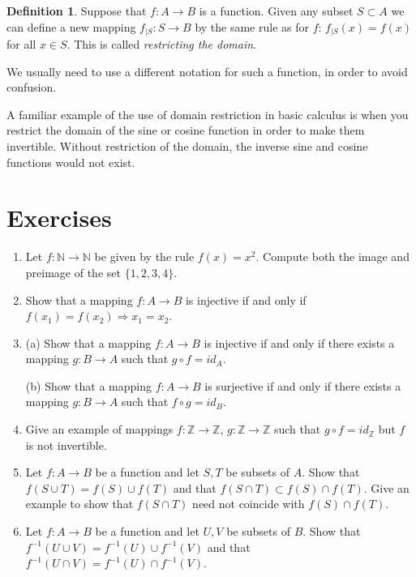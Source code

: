 \documentclass[11pt]{article}
\newenvironment{problems}
{
 \begin{enumerate}[topsep=1pt,itemsep=0pt,parsep=2pt,leftmargin=0.6cm,%
 label={\arabic*.}, ref=\arabic*] \small
}
{
 \end{enumerate}
}
\theoremstyle{definition}
\newtheorem{defn}[thm]{Definition}
\newcommand{\Z}{\mathbb{Z}} %
\newcommand{\N}{\mathbb{N}} %
\begin{document}
\begin{defn}
Suppose that $f: A \to B$ is a function.  Given any subset $S \subset
A$ we can define a new mapping $f_{|S}: S \to B$ by the same rule as
for $f$: $f_{|S}(x) = f(x)$ for all $x \in S$. This is called {\em
  restricting the domain}. 
\end{defn}

We usually need to use a different notation for such a function, in
order to avoid confusion.

A familiar example of the use of domain restriction in basic calculus
is when you restrict the domain of the sine or cosine function in
order to make them invertible. Without restriction of the domain, the
inverse sine and cosine functions would not exist.




\section*{Exercises}
\begin{problems}

\item Let $f: \N \to \N$ be given by the rule $f(x)=x^2$. Compute both
the image and preimage of the set $\{1,2,3,4\}$.

\item Show that a mapping $f: A \to B$ is injective if and only if
$f(x_1)=f(x_2) \Rightarrow x_1 = x_2$.

\item (a) Show that a mapping $f: A \to B$ is injective if and only if
there exists a mapping $g: B \to A$ such that $g\circ f = id_A$.
\par\noindent(b) Show that a mapping $f: A \to B$ is surjective if and
only if there exists a mapping $g: B \to A$ such that $f\circ g =
id_B$.

\item Give an example of mappings $f: \Z \to \Z$, $g: \Z \to \Z$ such that
$g \circ f = id_\Z$ but $f$ is not invertible.

\item Let $f: A \to B$ be a function and let $S,T$ be subsets of $A$.
Show that $f(S \cup T) = f(S) \cup f(T)$ and that $f(S \cap T) \subset
f(S)\cap f(T)$. Give an example to show that $f(S \cap T)$ need not
coincide with $f(S)\cap f(T)$.

\item Let $f: A \to B$ be a function and let $U,V$ be subsets of $B$.
Show that $f^{-1}(U \cup V) = f^{-1}(U) \cup f^{-1}(V)$ and that
$f^{-1}(U \cap V) = f^{-1}(U)\cap f^{-1}(V)$.


\end{problems}
\end{document}
